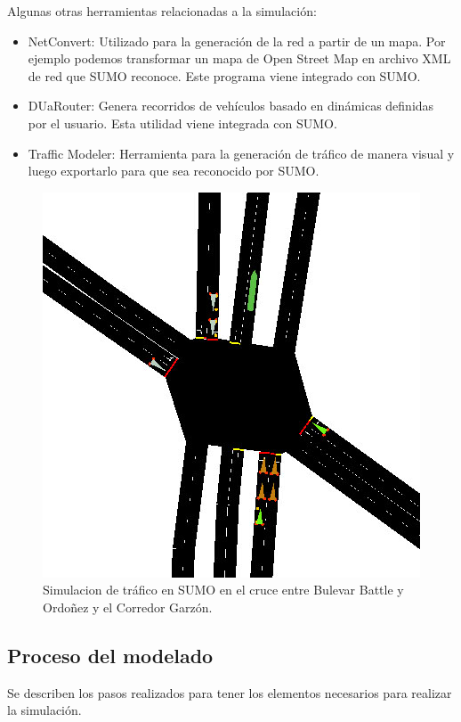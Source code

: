 Algunas otras herramientas relacionadas a la simulación:

\begin{itemize}
	
	\item  NetConvert: Utilizado para la generación de la red a partir de un mapa. Por ejemplo podemos transformar un mapa de Open Street Map en archivo XML de red que SUMO reconoce. Este programa viene integrado con SUMO.
	\item DUaRouter: Genera recorridos de vehículos basado en dinámicas definidas por el usuario. Esta utilidad viene integrada con SUMO.
	\item Traffic Modeler: Herramienta para la generación de tráfico de manera visual y luego exportarlo para que sea reconocido por SUMO. \citep{TrafficModeler}
	
	
\end{itemize}

\begin{figure}[h]
	\centering
	\includegraphics[width=0.7\linewidth]{Figures/sim1}
	\caption{Simulacion de tráfico en SUMO en el cruce entre Bulevar Battle y Ordoñez y el Corredor Garzón.}
	\label{fig:sim1}
\end{figure}



\subsection{Proceso del modelado}

Se describen los pasos realizados para tener los elementos necesarios para realizar la simulación.

